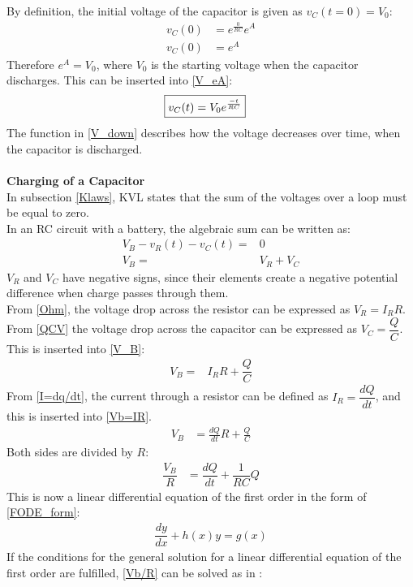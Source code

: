 By definition, the initial voltage of the capacitor is given as $v_C(t=0)=V_0$:
 \begin{align*}
	v_C(0) &= e^{\frac{0}{RC}}e^A\\
	v_C(0) &= e^A
 \end{align*}
Therefore $e^A = V_0$, where $V_0$ is the starting voltage when the capacitor discharges. This can be inserted into \eqref{V_eA}:
\begin{align}
\label{V_down}
\Aboxed{
 v_C(t) = V_0e^{\frac{-t}{RC}}
 }
\end{align}
The function in \eqref{V_down} describes how the voltage decreases over time, when the capacitor is discharged.
\\
\\
\textbf{Charging of a Capacitor}\\
In subsection \ref{Klaws}, KVL states that the sum of the voltages over a loop must be equal to zero. 
\\
In an RC circuit with a battery, the algebraic sum can be written as:
\begin{align}
V_B-v_R(t)-v_C(t) =& 0 \nonumber \\
V_B=&V_R+V_C \label{V_B}
\end{align}
$V_R$ and $V_C$ have negative signs, since their elements create a negative potential difference when charge passes through them.
\\
From \eqref{Ohm}, the voltage drop across the resistor can be expressed as $V_R=I_RR$. From \eqref{QCV} the voltage drop across the capacitor can be expressed as $V_C=\dfrac{Q}{C}$. This is inserted into \eqref{V_B}:
\begin{align}
V_B =& I_RR+\dfrac{Q}{C} \label{Vb=IR}
\end{align}
From \eqref{I=dq/dt}, the current through a resistor can be defined as $I_R =\dfrac{dQ}{dt}$, and this is inserted into \eqref{Vb=IR}.
 \begin{align*}
 	V_B &= \frac{dQ}{dt} R + \frac{Q}{C}
 \end{align*}
Both sides are divided by $R$:
\begin{align}
\dfrac{V_B}{R} &= \dfrac{dQ}{dt} + \dfrac{1}{RC}Q\label{Vb/R} 
\end{align}
This is now a linear differential equation of the first order in the form of \eqref{FODE_form}:
\begin{align*}
\dfrac{dy}{dx}+h(x)y=g(x)
\end{align*}
If the conditions for the general solution for a linear differential equation of the first order are fulfilled, \eqref{Vb/R} can be solved as in :
